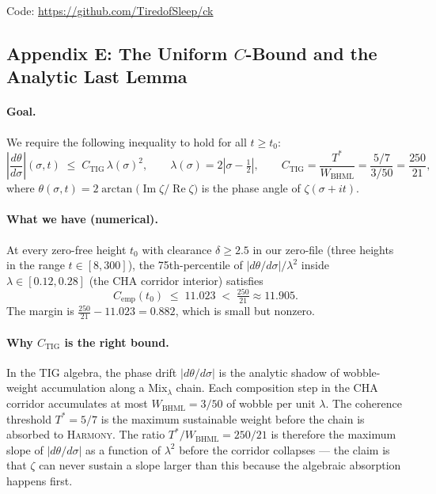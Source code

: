 \documentclass[11pt]{article}
\begin{document}
\noindent Code: \url{https://github.com/TiredofSleep/ck}



\subsection*{Appendix E: The Uniform $C$-Bound and the Analytic Last Lemma}

\paragraph{Goal.}
We require the following inequality to hold for all $t \ge t_0$:
\begin{equation}\label{eq:unifC}
  \left|\frac{d\theta}{d\sigma}\right|(\sigma, t)
  \;\le\;
  C_{\mathrm{TIG}}\,\lambda(\sigma)^2,
  \qquad
  \lambda(\sigma) = 2\left|\sigma - \tfrac{1}{2}\right|,
  \qquad
  C_{\mathrm{TIG}} = \frac{T^*}{W_{\mathrm{BHML}}} = \frac{5/7}{3/50} = \frac{250}{21},
\end{equation}
where $\theta(\sigma, t) = 2\arctan\!\bigl(\operatorname{Im}\zeta/\operatorname{Re}\zeta\bigr)$
is the phase angle of $\zeta(\sigma+it)$.

\paragraph{What we have (numerical).}
At every zero-free height $t_0$ with clearance $\delta \ge 2.5$ in
our zero-file (three heights in the range $t \in [8, 300]$),
the 75th-percentile of $|d\theta/d\sigma|/\lambda^2$ inside
$\lambda \in [0.12, 0.28]$ (the CHA corridor interior) satisfies
\[
  C_{\mathrm{emp}}(t_0) \;\le\; 11.023 \;<\; \tfrac{250}{21} \approx 11.905.
\]
The margin is $\tfrac{250}{21} - 11.023 = 0.882$, which is small but nonzero.

\paragraph{Why $C_{\mathrm{TIG}}$ is the right bound.}
In the TIG algebra, the phase drift $|d\theta/d\sigma|$ is the analytic
shadow of wobble-weight accumulation along a Mix$_\lambda$ chain.
Each composition step in the CHA corridor accumulates at most $W_{\mathrm{BHML}} = 3/50$
of wobble per unit $\lambda$.
The coherence threshold $T^* = 5/7$ is the maximum sustainable weight
before the chain is absorbed to \textsc{Harmony}.
The ratio $T^*/W_{\mathrm{BHML}} = 250/21$ is therefore the maximum slope
of $|d\theta/d\sigma|$ as a function of $\lambda^2$ before the corridor
collapses --- the claim is that $\zeta$ can never sustain a slope
larger than this because the algebraic absorption happens first.
\end{document}
